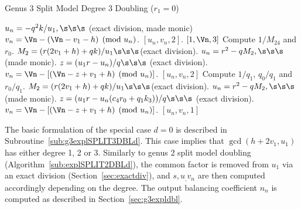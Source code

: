\begin{subroutine}[htbp]
\caption{Genus 3 Split Model Degree 3 Doubling ($r_1 = 0$)\label{sub:g3explSPLIT3DBLr1}}
\begin{algorithmic} [1]
    \State $u_n = -q^2k/u_1, \s\s\s$ (exact division, made monic)
    \State $v_n = \Vn - (\Vn - v_1 - h) \pmod{u_n}$.
    \State \Return $[u_n,v_n,2]$.
\Else
         \Return $[1,\Vn,3]$
        \Else
            \State Compute $1/M_{24}$ and $r_0$.
            \State $M_2 = (r(2v_1 + h) + qk)/u_1 \s\s\s $(exact division).
            \State $u_n = r^2 - qM_2, \s\s\s $ (made monic).
            \State $z = (u_1r - u_n)/q \s\s\s$ (exact division).
            \State $v_n = \Vn - [(\Vn - z + v_1 + h) \pmod{u_n}]$.
            \State \Return $[u_n,v_n,2]$
        \EndIf
    \EndIf
    \State Compute $1/q_1$, $q_0/q_1$ and $r_0/q_1$.
    \State $M_2 = (r(2v_1 + h) + qk)/u_1 \s\s\s $(exact division).
    \State $u_n = r^2 - qM_2, \s\s\s $ (made monic).
    \State $z = (u_1r - u_n(c_4r_0 + q_1k_3))/q \s\s\s$ (exact division).
    \State $v_n = \Vn - [(\Vn - z + v_1 + h) \pmod{u_n}]$.
    \State \Return $[u_n,v_n,1]$
\EndIf
\end{algorithmic}
\end{subroutine}

The basic formulation of the special case $d = 0$ is described in
Subroutine~\ref{sub:g3explSPLIT3DBLd}. This case implies that
$\gcd{(h + 2v_1, u_1)}$ has either degree 1, 2 or 3. Similarly to genus 2 split
model doubling (Algorithm~\ref{sub:explSPLIT2DBLd}), the common factor is
removed from $u_1$ via an exact division (Section~\ref{sec:exactdiv}), and
$s,u_,v_n$ are then computed accordingly depending on the degree.
The output balancing coefficient $n_n$ is computed as described in
Section~\ref{sec:g3expldbl}.

